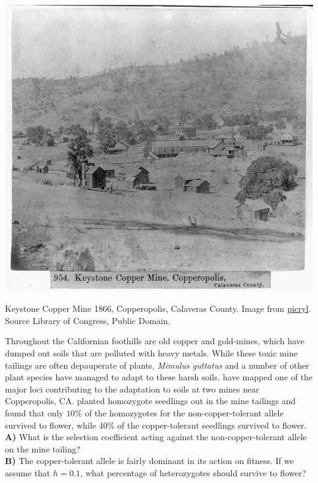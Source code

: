 \begin{marginfigure}
\begin{center}
\includegraphics[width = 1.2 \textwidth]{illustration_images/single_locus_selection/Copperopolis/KeystoneCopperMineCopperopolisCalaverasCounty.jpg}
\end{center}
\caption{Keystone Copper Mine 1866, Copperopolis, Calaveras
  County. \newline \noindent \tiny{ Image from
  \href{https://picryl.com/media/keystone-copper-mine-copperopolis-calaveras-county}{picryl}.
Source Library of Congress, Public Domain. }}
  \label{fig:Copperopolis}
\end{marginfigure}
\begin{question}{}
Throughout the Californian foothills are old copper and gold-mines, which have dumped out soils that are polluted with heavy metals. While these toxic mine tailings are often depauperate of plants,  {\it Mimulus guttatus} and a number of other plant species have managed to adapt to these harsh soils. \citet{wright2015adaptation} have mapped one of the major loci contributing to the adaptation to soils at two mines near Copperopolis, CA. \citeauthor{wright2015adaptation} planted homozygote seedlings out in the mine tailings and found that only $10\%$ of the homozygotes for the non-copper-tolerant allele survived to flower, while $40\%$ of the copper-tolerant seedlings survived to flower.\\


{\bf A)} What is the selection coefficient acting against the non-copper-tolerant allele on the mine tailing?\\
{\bf B)} The copper-tolerant allele is fairly dominant in its action on fitness. If we assume that $h=0.1$, what percentage of heterozygotes should survive to flower?
\end{question}
